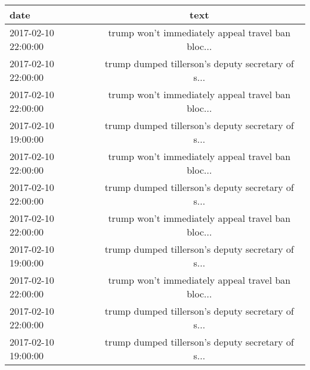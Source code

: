 \begin{tabular}{lc}
\toprule
               date &                                               text \\
\midrule
2017-02-10 22:00:00 &  trump won't immediately appeal travel ban bloc... \\
2017-02-10 22:00:00 &  trump dumped tillerson's deputy secretary of s... \\
2017-02-10 22:00:00 &  trump won't immediately appeal travel ban bloc... \\
2017-02-10 19:00:00 &  trump dumped tillerson's deputy secretary of s... \\
2017-02-10 22:00:00 &  trump won't immediately appeal travel ban bloc... \\
2017-02-10 22:00:00 &  trump dumped tillerson's deputy secretary of s... \\
2017-02-10 22:00:00 &  trump won't immediately appeal travel ban bloc... \\
2017-02-10 19:00:00 &  trump dumped tillerson's deputy secretary of s... \\
2017-02-10 22:00:00 &  trump won't immediately appeal travel ban bloc... \\
2017-02-10 22:00:00 &  trump dumped tillerson's deputy secretary of s... \\
2017-02-10 19:00:00 &  trump dumped tillerson's deputy secretary of s... \\
\bottomrule
\end{tabular}
